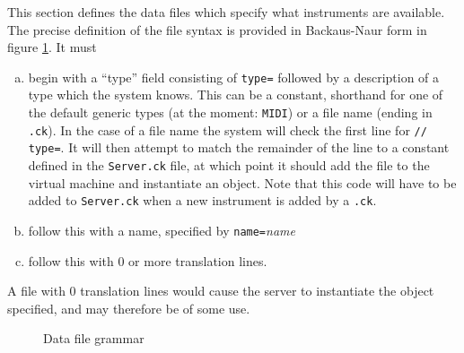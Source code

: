 \documentclass[12pt]{article}
\begin{document}
This section defines the data files which specify what instruments are available. The precise definition of the file syntax is provided in 
Backaus-Naur form in figure \ref{ebnfspec}. 
It must 
\begin{enumerate} [a)]
\item{begin with a ``type'' field consisting of \texttt{type=} followed by a description of a type which the system knows. This can be
a constant, shorthand for one of the default generic types (at the moment: \texttt{MIDI}) or a file name (ending in \texttt{.ck}). In the case of a file name
the system will check the first line for \texttt{// type=}. It will then attempt to match the remainder of the line to a constant defined in the \texttt{Server.ck}
file, at which point it should add the file to the virtual machine and instantiate an object. Note that this code will have to be added to \texttt{Server.ck}
when a new instrument is added by a \texttt{.ck}.}
\item{follow this with a name, specified by \texttt{name=}\textit{name}}
\item{follow this with 0 or more translation lines.}

\end{enumerate}

A file with 0 translation lines would cause the server to instantiate the object specified, and may therefore be of some use.

\begin{figure} [htp]
\setlength{\grammarindent}{12em}


\caption[Grammar]{Data file grammar}
\label{ebnfspec}
\end{figure}
\end{document}
